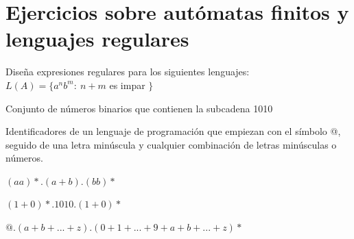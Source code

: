 \section{Ejercicios sobre autómatas finitos y lenguajes regulares}

\begin{problem}[1]
Diseña expresiones regulares para los siguientes lenguajes:
\ppart$L(A) = \lbrace a^nb^m : \ n+m$ es impar $\rbrace$

\ppart Conjunto de números binarios que contienen la subcadena 1010

\ppart Identificadores de un lenguaje de programación que empiezan con el símbolo @, seguido de una letra minúscula y cualquier combinación de letras minúsculas o números.

\solution

\spart
$(aa)*.(a+b).(bb)*$

\spart
$(1+0)*.1010.(1+0)*$

\spart
$@.(a+b+...+z).(0+1+...+9+a+b+...+z)*$
 

\end{problem}


